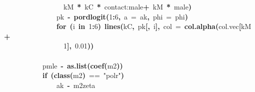 \documentclass{article}
\makeatletter
\newcommand{\hlnumber}[1]{\textcolor[rgb]{0,0,0}{#1}}%
\newcommand{\hlfunctioncall}[1]{\textcolor[rgb]{.5,0,.33}{\textbf{#1}}}%
\newcommand{\hlstring}[1]{\textcolor[rgb]{.6,.6,1}{#1}}%
\newcommand{\hlkeyword}[1]{\textbf{#1}}%
\newcommand{\hlargument}[1]{\textcolor[rgb]{.69,.25,.02}{#1}}%
\newcommand{\hlassignement}[1]{\textbf{#1}}%
\newcommand{\hlsymbol}[1]{#1}%
\newcommand{\hlstd}[1]{\textcolor[rgb]{0,0,0}{#1}}%
\newenvironment{kframe}{%
 \def\FrameCommand##1{\hskip\@totalleftmargin \hskip-\fboxsep
 \colorbox{shadecolor}{##1}\hskip-\fboxsep
     \hskip-\linewidth \hskip-\@totalleftmargin \hskip\columnwidth}%
 \MakeFramed {\advance\hsize-\width
   \@totalleftmargin\z@ \linewidth\hsize
   \@setminipage}}%
 {\par\unskip\endMakeFramed}
\newenvironment{knitrout}{}{} %
\makeatother
\begin{document}
\begin{knitrout}
{\begin{kframe}
\begin{flushleft}
\hlstd{}{\ }{\ }{\ }{\ }{\ }{\ }{\ }{\ }{\ }{\ }{\ }{\ }{\ }{\ }{\ }{\ }{\ }{\ }\hlsymbol{kM}{\ }\hlkeyword{*}{\ }\hlsymbol{kC}{\ }\hlkeyword{*}{\ }\hlsymbol{\usebox{\hlnormalsizeboxbacktick}contact:male\usebox{\hlnormalsizeboxbacktick}}{\ }\hlkeyword{+}{\ }\hlsymbol{kM}{\ }\hlkeyword{*}{\ }\hlsymbol{male}\hlkeyword{)}\hspace*{\fill}\\
\hlstd{}{\ }{\ }{\ }{\ }{\ }{\ }{\ }{\ }{\ }{\ }{\ }{\ }{\ }{\ }{\ }{\ }\hlsymbol{pk}{\ }\hlassignement{\usebox{\hlnormalsizeboxlessthan}-}{\ }\hlfunctioncall{pordlogit}\hlkeyword{(}\hlnumber{1}\hlkeyword{:}\hlnumber{6}\hlkeyword{,}{\ }\hlargument{a}{\ }\hlargument{=}{\ }\hlsymbol{ak}\hlkeyword{,}{\ }\hlargument{phi}{\ }\hlargument{=}{\ }\hlsymbol{phi}\hlkeyword{)}\hspace*{\fill}\\
\hlstd{}{\ }{\ }{\ }{\ }{\ }{\ }{\ }{\ }{\ }{\ }{\ }{\ }{\ }{\ }{\ }{\ }\hlkeyword{for}{\ }\hlkeyword{(}\hlsymbol{i}{\ }\hlkeyword{in}{\ }\hlnumber{1}\hlkeyword{:}\hlnumber{6}\hlkeyword{)}{\ }\hlfunctioncall{lines}\hlkeyword{(}\hlsymbol{kC}\hlkeyword{,}{\ }\hlsymbol{pk}\hlkeyword{[}\hlkeyword{,}{\ }\hlsymbol{i}\hlkeyword{]}\hlkeyword{,}{\ }\hlargument{col}{\ }\hlargument{=}{\ }\hlfunctioncall{col.alpha}\hlkeyword{(}\hlsymbol{col.vec}\hlkeyword{[}\hlsymbol{kM}{\ }\hlkeyword{+}\hspace*{\fill}\\
\hlstd{}{\ }{\ }{\ }{\ }{\ }{\ }{\ }{\ }{\ }{\ }{\ }{\ }{\ }{\ }{\ }{\ }{\ }{\ }\hlnumber{1}\hlkeyword{]}\hlkeyword{,}{\ }\hlnumber{0.01}\hlkeyword{)}\hlkeyword{)}\hspace*{\fill}\\
\hlstd{}{\ }{\ }{\ }{\ }{\ }{\ }{\ }{\ }{\ }{\ }{\ }{\ }\hlkeyword{\usebox{\hlnormalsizeboxclosebrace}}\hspace*{\fill}\\
\hlstd{}{\ }{\ }{\ }{\ }{\ }{\ }{\ }{\ }{\ }{\ }{\ }{\ }\hlsymbol{pmle}{\ }\hlassignement{\usebox{\hlnormalsizeboxlessthan}-}{\ }\hlfunctioncall{as.list}\hlkeyword{(}\hlfunctioncall{coef}\hlkeyword{(}\hlsymbol{m2}\hlkeyword{)}\hlkeyword{)}\hspace*{\fill}\\
\hlstd{}{\ }{\ }{\ }{\ }{\ }{\ }{\ }{\ }{\ }{\ }{\ }{\ }\hlkeyword{if}{\ }\hlkeyword{(}\hlfunctioncall{class}\hlkeyword{(}\hlsymbol{m2}\hlkeyword{)}{\ }=={\ }\hlstring{"polr"}\hlkeyword{)}\hspace*{\fill}\\
\hlstd{}{\ }{\ }{\ }{\ }{\ }{\ }{\ }{\ }{\ }{\ }{\ }{\ }{\ }{\ }{\ }{\ }\hlsymbol{ak}{\ }\hlassignement{\usebox{\hlnormalsizeboxlessthan}-}{\ }\hlsymbol{m2}\hlkeyword{\usebox{\hlnormalsizeboxdollar}}\hlsymbol{zeta}\hspace*{\fill}\\

\end{flushleft}
\end{kframe}}
\end{knitrout}
\end{document}
